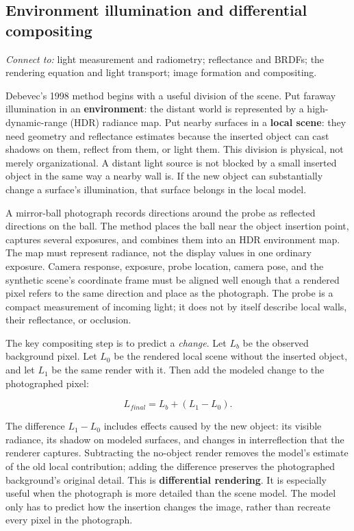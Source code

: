 \subsection{Environment illumination and differential compositing}\label{03-visual-computing-i-ch004-environment-illumination-and-differential-compositing}

\hypertarget{03-visual-computing-i-ch004-environment-illumination-and-differential-compositing}{}

\emph{Connect to:} light measurement and radiometry; reflectance and BRDFs; the rendering equation and light transport; image formation and compositing.

Debevec's 1998 method begins with a useful division of the scene. Put faraway illumination in an \textbf{environment}: the distant world is represented by a high-dynamic-range (HDR) radiance map. Put nearby surfaces in a \textbf{local scene}: they need geometry and reflectance estimates because the inserted object can cast shadows on them, reflect from them, or light them. This division is physical, not merely organizational. A distant light source is not blocked by a small inserted object in the same way a nearby wall is. If the new object can substantially change a surface's illumination, that surface belongs in the local model.

A mirror-ball photograph records directions around the probe as reflected directions on the ball. The method places the ball near the object insertion point, captures several exposures, and combines them into an HDR environment map. The map must represent radiance, not the display values in one ordinary exposure. Camera response, exposure, probe location, camera pose, and the synthetic scene's coordinate frame must be aligned well enough that a rendered pixel refers to the same direction and place as the photograph. The probe is a compact measurement of incoming light; it does not by itself describe local walls, their reflectance, or occlusion.

The key compositing step is to predict a \emph{change}. Let \(L_b\) be the observed background pixel. Let \(L_0\) be the rendered local scene without the inserted object, and let \(L_1\) be the same render with it. Then add the modeled change to the photographed pixel:

\[L_{final}=L_b+(L_1-L_0).\]

The difference \(L_1-L_0\) includes effects caused by the new object: its visible radiance, its shadow on modeled surfaces, and changes in interreflection that the renderer captures. Subtracting the no-object render removes the model's estimate of the old local contribution; adding the difference preserves the photographed background's original detail. This is \textbf{differential rendering}. It is especially useful when the photograph is more detailed than the scene model. The model only has to predict how the insertion changes the image, rather than recreate every pixel in the photograph.

